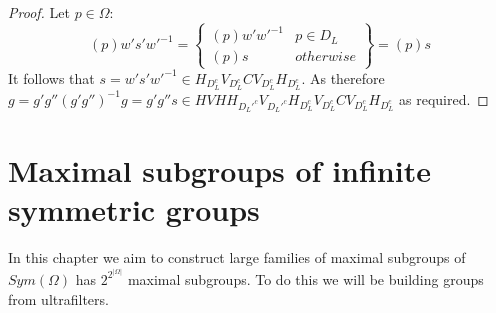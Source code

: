 \documentclass{report}
\begin{document}
\begin{proof}
Let \(p\in \Omega\):
\[(p)w's'w'^{-1}=\left\{\begin{array}{lr}
(p)w'w'^{-1} & p\in D_L\\
(p)s & otherwise
\end{array}\right\}=(p)s\]
It follows that \(s=w's'w'^{-1}\in H_{D_L^c}V_{D_L^c}CV_{D_L^c}H_{D_L^c}\). As therefore \(g=g'g''(g'g'')^{-1}g=g'g''s\in HVHH_{D_L'^c}V_{D_L'^c}H_{D_L^c}V_{D_L^c}CV_{D_L^c}H_{D_L^c}\) as required.
\end{proof}
\chapter{Maximal subgroups of infinite symmetric groups}
In this chapter we aim to construct large families of maximal subgroups of $Sym(\Omega)$ has $2^{2^{\vert \Omega \vert}}$ maximal subgroups. To do this we will be building groups from ultrafilters.
\end{document}
